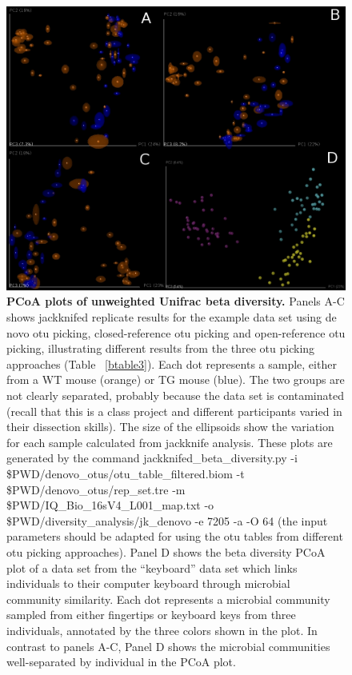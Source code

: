 \begin{figure}[htbp]
\includegraphics[width=0.75\columnwidth]{chapter_book_figures/Figure_7.jpg}
\caption[PCoA plots of unweighted Unifrac beta diversity]{\textbf{PCoA plots of unweighted Unifrac beta diversity.}
Panels A-C shows jackknifed replicate results for the example data set using de novo \gls{otu} picking,
closed-reference \gls{otu} picking and open-reference \gls{otu} picking, illustrating different results from the
three \gls{otu} picking approaches (Table ~\ref{btable3}). Each dot represents a sample, either from a WT
mouse (orange) or TG mouse (blue). The two groups are not clearly separated, probably because the
data set is contaminated (recall that this is a class project and different participants varied in
their dissection skills). The size of the ellipsoids show the variation for each sample calculated
from jackknife analysis. These plots are generated by the command jackknifed\_beta\_diversity.py
-i \$PWD/denovo\_otus/otu\_table\_filtered.biom -t \$PWD/denovo\_otus/rep\_set.tre -m \$PWD/IQ\_Bio\_16sV4\_L001\_map.txt
-o \$PWD/diversity\_analysis/jk\_denovo -e 7205 -a -O 64 (the input parameters should be adapted for using
the \gls{otu} tables from different \gls{otu} picking approaches). Panel D shows the beta diversity PCoA plot of a data set
from the “keyboard” data set \cite{Fierer2010} which links individuals to their computer keyboard through
microbial community similarity. Each dot represents a microbial community sampled from either fingertips or
keyboard keys from three individuals, annotated by the three colors shown in the plot. In contrast to panels A-C,
Panel D shows the microbial communities well-separated by individual in the PCoA plot.}
\label{bfigure7}
\end{figure}

